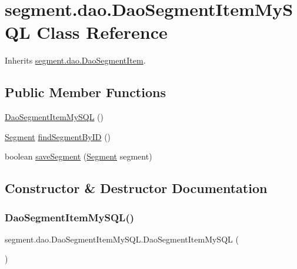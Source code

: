 \hypertarget{classsegment_1_1dao_1_1_dao_segment_item_my_s_q_l}{}\section{segment.\+dao.\+Dao\+Segment\+Item\+My\+S\+QL Class Reference}
\label{classsegment_1_1dao_1_1_dao_segment_item_my_s_q_l}


Inherits \mbox{\hyperlink{interfacesegment_1_1dao_1_1_dao_segment_item}{segment.\+dao.\+Dao\+Segment\+Item}}.

\subsection*{Public Member Functions}
\begin{DoxyCompactItemize}
\item 
\mbox{\hyperlink{classsegment_1_1dao_1_1_dao_segment_item_my_s_q_l_a49b60baa7e9d1c3210b14db99eb945fb}{Dao\+Segment\+Item\+My\+S\+QL}} ()
\item 
\mbox{\hyperlink{classclases_1_1_segment}{Segment}} \mbox{\hyperlink{classsegment_1_1dao_1_1_dao_segment_item_my_s_q_l_aa448b5ac94351b927a9b8b4da988d55a}{find\+Segment\+By\+ID}} ()
\item 
boolean \mbox{\hyperlink{classsegment_1_1dao_1_1_dao_segment_item_my_s_q_l_a094dab67038c9f56c9bafc9a596109dc}{save\+Segment}} (\mbox{\hyperlink{classclases_1_1_segment}{Segment}} segment)
\end{DoxyCompactItemize}


\subsection{Constructor \& Destructor Documentation}
\mbox{\label{classsegment_1_1dao_1_1_dao_segment_item_my_s_q_l_a49b60baa7e9d1c3210b14db99eb945fb}} 
\subsubsection{\texorpdfstring{Dao\+Segment\+Item\+My\+S\+Q\+L()}{DaoSegmentItemMySQL()}}
{\footnotesize\ttfamily segment.\+dao.\+Dao\+Segment\+Item\+My\+S\+Q\+L.\+Dao\+Segment\+Item\+My\+S\+QL (\begin{DoxyParamCaption}{ }\end{DoxyParamCaption})}



